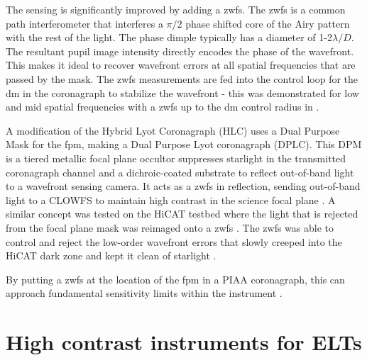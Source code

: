 \documentclass[letterpaper]{ar-1col}
\newcommand{\ld}{$\lambda/D$}
\begin{document}
The sensing is significantly improved by adding a \ac{zwfs}. The \ac{zwfs} is a common path interferometer that interferes a $\pi/2$ phase shifted core of the Airy pattern with the rest of the light. The phase dimple typically has a diameter of 1-2\ld{}. The resultant pupil image intensity directly encodes the phase of the wavefront. This makes it ideal to recover wavefront errors at all spatial frequencies that are passed by the mask.  The \ac{zwfs} measurements are fed into the control loop for the \ac{dm} in the coronagraph to stabilize the wavefront - this was demonstrated for low and mid spatial frequencies with a \ac{zwfs} up to the \ac{dm} control radius in \citet{Ruane20}.

A modification of the Hybrid Lyot Coronagraph (HLC) uses a Dual Purpose Mask for the \ac{fpm}, making a Dual Purpose Lyot coronagraph (DPLC).
%
This DPM is a tiered metallic focal plane occultor suppresses starlight in the transmitted coronagraph channel and a dichroic-coated substrate to reflect out-of-band light to a wavefront sensing camera.
%
It acts as a \ac{zwfs} in reflection, sending out-of-band light to a CLOWFS to maintain high contrast in the science focal plane \citep{Ruane23}. A similar concept was tested on the HiCAT testbed where the light that is rejected from the focal plane mask was reimaged onto a \ac{zwfs} \citep{Pourcelot22,Pourcelot23}. The \ac{zwfs} was able to control and reject the low-order wavefront errors that slowly creeped into the HiCAT dark zone and kept it clean of starlight \citep{Soummer22}.

By putting a \ac{zwfs} at the location of the \ac{fpm} in a PIAA coronagraph, this can approach fundamental sensitivity limits within the instrument \citep{Haffert23}.

%

\section{High contrast instruments for ELTs}
\end{document}
